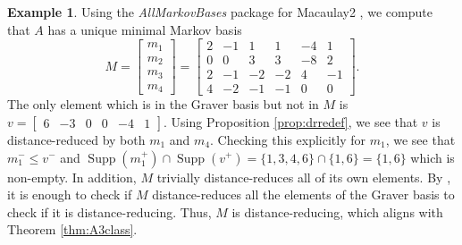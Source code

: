 \documentclass[a4paper, 12pt]{article}
\newcommand{\ZZ}{\mathbb Z}
\theoremstyle{plain}
\theoremstyle{definition}
\newtheorem{example}[theorem]{Example}
\theoremstyle{remark}
\begin{document}
\begin{example}
    
    Using the \textit{AllMarkovBases} package \cite{CM_2025} for Macaulay2 \cite{M2}, we compute that $A$ has a unique minimal Markov basis
    $$M=\begin{bmatrix}m_1\\m_2\\m_3\\m_4\end{bmatrix}=\begin{bmatrix}
        2&-1&1&1&-4&1\\
        0&0&3&3&-8&2\\
        2&-1&-2&-2&4&-1\\
        4&-2&-1&-1&0&0
    \end{bmatrix}.$$
    The only element which is in the Graver basis but not in $M$ is $v=\begin{bmatrix}6&-3&0&0&-4&1\end{bmatrix}$. Using Proposition \ref{prop:drredef}, we see that $v$ is distance-reduced by both $m_1$ and $m_4$. Checking this explicitly for $m_1$, we see that $m_1^- \le v^-$ and $\operatorname{Supp}(m_1^+) \cap \operatorname{Supp}(v^+)=\{1,3,4,6\} \cap \{1,6\}=\{1,6\}$ which is non-empty. In addition, $M$ trivially distance-reduces all of its own elements. By \cite[Theorem 7.4]{CK_2024}, it is enough to check if $M$ distance-reduces all the elements of the Graver basis to check if it is distance-reducing. Thus, $M$ is distance-reducing, which aligns with Theorem \ref{thm:A3class}.


\end{example}
\end{document}
